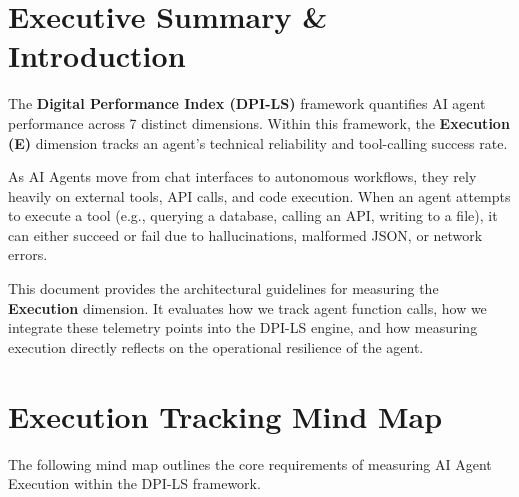 \documentclass[11pt,a4paper]{article}
\begin{document}
\pagecolor{white}
\color{black}

\tableofcontents
\newpage

\section{Executive Summary \& Introduction}

\begin{dpinote}
The \textbf{Digital Performance Index (DPI-LS)} framework quantifies AI agent performance across 7 distinct dimensions. Within this framework, the \textbf{Execution (E)} dimension tracks an agent's technical reliability and tool-calling success rate.
\end{dpinote}

As AI Agents move from chat interfaces to autonomous workflows, they rely heavily on external tools, API calls, and code execution. When an agent attempts to execute a tool (e.g., querying a database, calling an API, writing to a file), it can either succeed or fail due to hallucinations, malformed JSON, or network errors.

This document provides the architectural guidelines for measuring the \textbf{Execution} dimension. It evaluates how we track agent function calls, how we integrate these telemetry points into the DPI-LS engine, and how measuring execution directly reflects on the operational resilience of the agent.

\vspace{0.5cm}

\section{Execution Tracking Mind Map}

The following mind map outlines the core requirements of measuring AI Agent Execution within the DPI-LS framework.
\end{document}
